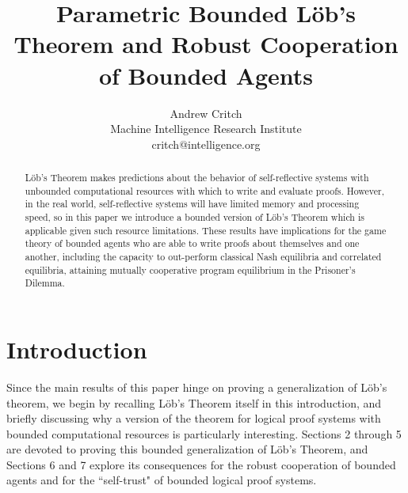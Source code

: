 \documentclass[onecolumn]{miri-tech-article}
\title{Parametric Bounded L\"{o}b's Theorem and Robust Cooperation of Bounded Agents}
\author{Andrew Critch \\ Machine Intelligence Research Institute \\ critch@intelligence.org}
\numberwithin{equation}{section}
\theoremstyle{definition}
\renewcommand{\-}{^{-1}}
\begin{document}
\publishingnote{}

\maketitle

\begin{abstract}
L\"{o}b's Theorem makes predictions about the behavior of self-reflective systems with unbounded computational resources with which to write and evaluate proofs.  However, in the real world, self-reflective systems will have limited memory and processing speed, so in this paper we introduce a bounded version of L\"{o}b's Theorem which is applicable given such resource limitations.  
These results have implications for the game theory of bounded agents who are able to write proofs about themselves and one another, including the capacity to out-perform classical Nash equilibria and correlated equilibria, attaining mutually cooperative program equilibrium in the Prisoner's Dilemma.
\end{abstract}

\section{Introduction}\label{sec:bo}
Since the main results of this paper hinge on proving a generalization of L\"{o}b's theorem, we begin by recalling L\"{o}b's Theorem itself in this introduction, and briefly discussing why a version of the theorem for logical proof systems with bounded computational resources is particularly interesting.   Sections 2 through 5 are devoted to proving this bounded generalization of L\"{o}b's Theorem, and Sections 6 and 7 explore its consequences for the robust cooperation of bounded agents and for the ``self-trust" of bounded logical proof systems.
\end{document}
